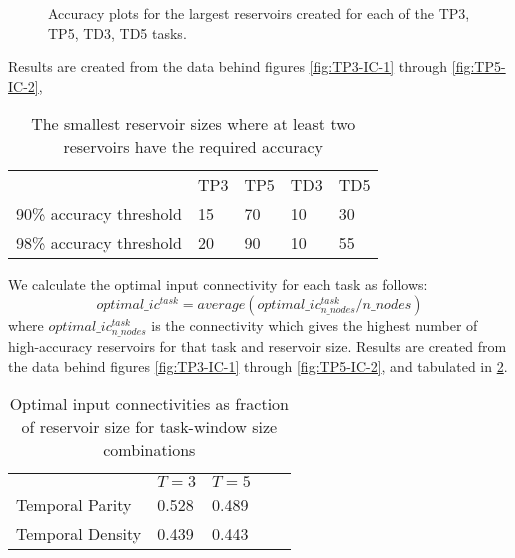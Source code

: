 \begin{figure}[ht]
    \centering
    \caption{Accuracy plots for the largest reservoirs created for each of the TP3, TP5, TD3, TD5 tasks.}

    \label{fig:accuracy-max-size}
    \resizebox{\textwidth}{!}{
        \subfloat[TP3, N=100]{
            
        }
        \subfloat[TP5, N=140]{
            
        }
    }
    \resizebox{\textwidth}{!}{
        \subfloat[TD3, N=30]{
            
        }
        \subfloat[TD5, N=65]{
            
        }
    }
\end{figure}

Results are created from the data behind figures \ref{fig:TP3-IC-1} through \ref{fig:TP5-IC-2},

\begin{table}[ht]
    \centering
    \caption{The smallest reservoir sizes where at least two reservoirs have the required accuracy}
    \label{tab:accuracy-thresholds}
    \begin{tabular}{lllll}
                     & TP3 & TP5 & TD3 & TD5 \\
    90\% accuracy threshold & 15  & 70  & 10  & 30  \\
    98\% accuracy threshold & 20  & 90 & 10  & 55
    \end{tabular}
\end{table}


We calculate the optimal input connectivity for each task as follows:
$$ optimal\_ic^{task} = average(optimal\_ic_{n\_nodes}^{task} / n\_nodes) $$
where $ optimal\_ic_{n\_nodes}^{task} $ is the connectivity which gives the highest number of high-accuracy reservoirs for that task and reservoir size.
Results are created from the data behind figures \ref{fig:TP3-IC-1} through \ref{fig:TP5-IC-2},
and tabulated in \ref{tab:optimal-ic}.

\begin{table}[h]
	\centering
	\caption{Optimal input connectivities as fraction of reservoir size for task-window size combinations }
	\label{tab:optimal-ic}
	\begin{tabular}{lllll}
						 & $T=3$  & $T=5$ \\
        Temporal Parity  & 0.528          & 0.489         \\
        Temporal Density & 0.439          & 0.443
	\end{tabular}
\end{table}

